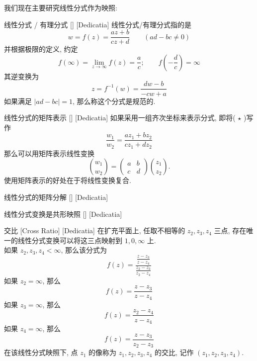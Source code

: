 \documentclass[UTF8]{ctexart}
\begin{document}
        我们现在主要研究线性分式作为映照: 

        \begin{dfn}
            [UUID]
            {线性分式 / 有理分式}
            []
            [Dedicatia]
            线性分式/有理分式指的是
            \[w=f(z)=\frac{az+b}{cz+d}\qquad(ad-bc\neq 0)\tag{ \(\star\) }\]
            并根据极限的定义, 约定
            \[f(\infty)=\lim_{z\to\infty}f(z)=\dfrac{a}{c};\qquad f\left(-\dfrac{d}{c}\right)=\infty\]
            其逆变换为
            \[z=f^{-1}(w)=\frac{dw-b}{-cw+a}\]
            如果满足 \(|ad-bc|=1\), 那么称这个分式是规范的. 
        \end{dfn}

        \begin{ppt}
            [UUID]
            {线性分式的矩阵表示}
            []
            [Dedicatia]
            如果采用一组齐次坐标来表示分式, 即将( \(\star\) )写作
            \[\frac{w_1}{w_2}=\frac{az_1+bz_2}{cz_1+dz_2}\]
            那么可以用矩阵表示线性变换
            \[\binom{w_1}{w_2}=\begin{pmatrix}
                a&b\\c&d
            \end{pmatrix}\binom{z_1}{z_2}.\]
            使用矩阵表示的好处在于将线性变换复合. 
        \end{ppt}

        \begin{ppt}
            [UUID]
            {线性分式的矩阵分解}
            []
            [Dedicatia]
        \end{ppt}

        \begin{ppt}
            [UUID]
            {线性分式变换是共形映照}
            []
            [Dedicatia]
        \end{ppt}
        
        \begin{dfn}
            [UUID]
            {交比}
            [Cross Ratio]
            [Dedicatia]
            在扩充平面上, 任取不相等的 \(z_2,z_3,z_4\) 三点, 存在唯一的线性分式变换可以将这三点映射到 \(1,0,\infty\) 上. \\
            如果 \(z_2,z_3,z_4<\infty\), 那么该分式为
            \[f(z)=\frac{\frac{z-z_3}{z-z_4}}{\frac{z_2-z_3}{z_2-z_4}}\]
            如果 \(z_2=\infty\), 那么
            \[f(z)=\frac{z-z_3}{z-z_4}\]
            如果 \(z_3=\infty\), 那么
            \[f(z)=\frac{z_2-z_4}{z-z_4}\]
            如果 \(z_4=\infty\), 那么
            \[f(z)=\frac{z-z_3}{z_2-z_3}\]
            在该线性分式映照下, 点 \(z_1\) 的像称为 \(z_1,z_2,z_3,z_4\) 的交比, 记作 \((z_1,z_2,z_3,z_4)\).
        \end{dfn}
\end{document}
